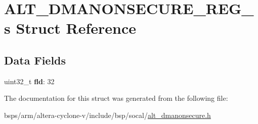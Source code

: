 \hypertarget{structALT__DMANONSECURE__REG__s}{}\section{A\+L\+T\+\_\+\+D\+M\+A\+N\+O\+N\+S\+E\+C\+U\+R\+E\+\_\+\+R\+E\+G\+\_\+s Struct Reference}
\label{structALT__DMANONSECURE__REG__s}
\subsection*{Data Fields}
\begin{DoxyCompactItemize}
\item 
\mbox{\label{structALT__DMANONSECURE__REG__s_aac7f1a099232fa3e053eeb63a342d6ba}} 
uint32\+\_\+t {\bfseries fld}\+: 32
\end{DoxyCompactItemize}


The documentation for this struct was generated from the following file\+:\begin{DoxyCompactItemize}
\item 
bsps/arm/altera-\/cyclone-\/v/include/bsp/socal/\mbox{\hyperlink{alt__dmanonsecure_8h}{alt\+\_\+dmanonsecure.\+h}}\end{DoxyCompactItemize}

